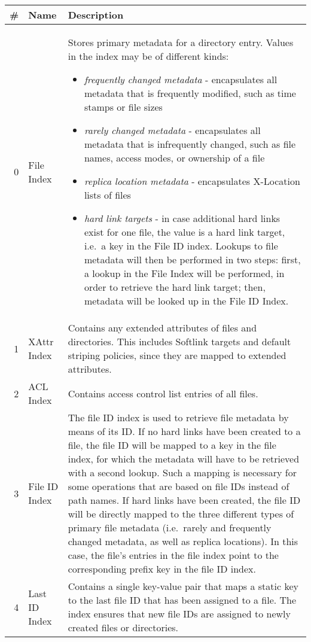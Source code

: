 \begin{footnotesize}
\begin{center}
\begin{tabularx}{\linewidth}{|r|l|X|}
\hline
\textbf{\#} & \textbf{Name} & \textbf{Description} \\
\hline
0 & File Index & Stores primary metadata for a directory entry. Values in the index may be of different kinds:
\begin{itemize}
 \item \emph{frequently changed metadata} - encapsulates all metadata that is frequently modified, such as time stamps or file sizes
 \item \emph{rarely changed metadata} - encapsulates all metadata that is infrequently changed, such as file names, access modes, or ownership of a file
 \item \emph{replica location metadata} - encapsulates X-Location lists of files
 \item \emph{hard link targets} - in case additional hard links exist for one file, the value is a hard link target, i.e.\ a key in the File ID index. Lookups to file metadata will then be performed in two steps: first, a lookup in the File Index will be performed, in order to retrieve the hard link target; then, metadata will be looked up in the File ID Index.
\end{itemize}
\\ 
\hline
1 & XAttr Index & Contains any extended attributes of files and directories. This includes Softlink targets and default striping policies, since they are mapped to extended attributes.\\
\hline
2 & ACL Index & Contains access control list entries of all files.\\
\hline
3 & File ID Index & The file ID index is used to retrieve file metadata by means of its ID. If no hard links have been created to a file, the file ID will be mapped to a key in the file index, for which the metadata will have to be retrieved with a second lookup. Such a mapping is necessary for some operations that are based on file IDs instead of path names. If hard links have been created, the file ID will be directly mapped to the three different types of primary file metadata (i.e.\ rarely and frequently changed metadata, as well as replica locations). In this case, the file's entries in the file index point to the corresponding prefix key in the file ID index.\\
\hline
4 & Last ID Index & Contains a single key-value pair that maps a static key to the last file ID that has been assigned to a file. The index ensures that new file IDs are assigned to newly created files or directories.\\
\hline
\end{tabularx}
\end{center}
\end{footnotesize}


